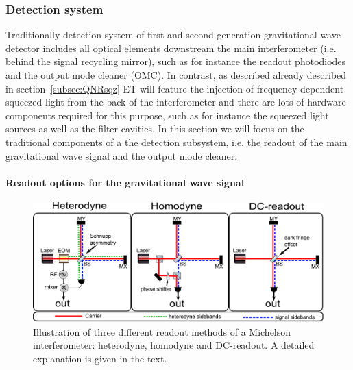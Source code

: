 \FloatBarrier
\subsubsection{Detection system}\label{sec:detection}
Traditionally detection system of first and second generation gravitational wave detector includes all
optical elements downstream the main interferometer (i.e. behind the signal
recycling mirror), such as for instance the readout photodiodes and the output mode
cleaner (OMC). In contrast,  as described already described in section~\ref{subsec:QNRsqz}
ET will feature the injection of frequency dependent squeezed light from the back of the interferometer
and there are lots of hardware components required for this purpose, such as for instance the squeezed light sources
as well as the filter cavities. In this section we will focus on the traditional components of a the detection
subsystem, i.e. the readout of the main gravitational wave signal and the output mode cleaner. 

\FloatBarrier
\paragraph{Readout options for the gravitational wave signal}

\begin{figure}[th]
\centering
\includegraphics[width=1\textwidth]{Sec_Optics/homo_hetero_schematic.pdf}
\caption[Different readout methods of a Michelson interferometer]{Illustration of three different 
readout methods of a Michelson interferometer:
heterodyne, homodyne and DC-readout. A detailed explanation is given in the text.}
\label{fig:principle}
\end{figure}


